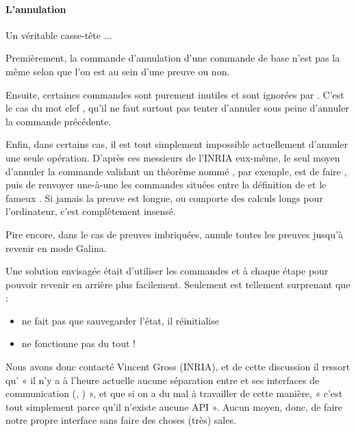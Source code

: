     	\paragraph*{L'annulation\\}
    	    Un véritable casse-tête $\ldots$
    	    
    	    Premièrement, la commande d'annulation d'une commande de base n'est pas la même selon que l'on est au sein d'une preuve ou non.
    	    
    	    Ensuite, certaines commandes sont purement inutiles et sont ignorées par \coqtop.
    	    C'est le cas du mot clef , qu'il ne faut surtout pas tenter d'annuler sous peine d'annuler la commande précédente.
    	    
    	    Enfin, dans certains cas, il est tout simplement impossible actuellement d'annuler une seule opération.
    	    D'après ces messieurs de l'INRIA eux-même, le seul moyen d'annuler la commande  validant un théorème nommé , par exemple, est de faire , puis de renvoyer une-à-une les commandes situées entre la définition de  et le fameux .
    	    Si jamais la preuve est longue, ou comporte des calculs longs pour l'ordinateur, c'est complètement insensé.
    	    
    	    Pire encore, dans le cas de preuves imbriquées,  annule toutes les preuves jusqu'à revenir en mode Galina.
    	    
            Une solution envisagée était d'utiliser les commandes  et  à chaque étape pour pouvoir revenir en arrière plus facilement.
            Seulement \coqtop est tellement surprenant que :
            \begin{itemize}
             	\item {} ne fait pas que sauvegarder l'état, il réinitialise \coqtop
             	\item {} ne fonctionne pas du tout !
             \end{itemize}
		
		Nous avons donc contacté Vincent Gross (INRIA), et de cette discussion il ressort qu' « il n'y a à l'heure actuelle aucune séparation entre \coq et ses interfaces de communication (\coqtop, \coqide) », et que si on a du mal à travailler de cette manière, « c'est tout simplement parce qu'il n'existe aucune API ».
		Aucun moyen, donc, de faire notre propre interface sans faire des choses (très) sales.
				
